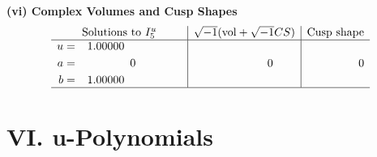 \documentclass[1p]{elsarticle_modified}
\theoremstyle{definition}
\newcommand{\I}{\sqrt{-1}}
\begin{document}
\newpage\flushleft \textbf{(vi) Complex Volumes and Cusp Shapes}
$$\begin{array}{c|c|c}  
\text{Solutions to }I^u_{5}& \I (\text{vol} + \sqrt{-1}CS) & \text{Cusp shape}\\
 \hline 
\begin{aligned}
u &= \phantom{-}1.00000\phantom{ +0.000000I} \\
a &= \phantom{-0.000000 } 0 \\
b &= \phantom{-}1.00000\phantom{ +0.000000I}\end{aligned}
 & \phantom{-0.000000 } 0 & \phantom{-0.000000 } 0\\
 \hline 
 \end{array}$$\newpage
\newpage\renewcommand{\arraystretch}{1}
\centering \section*{ VI. u-Polynomials}
\end{document}
